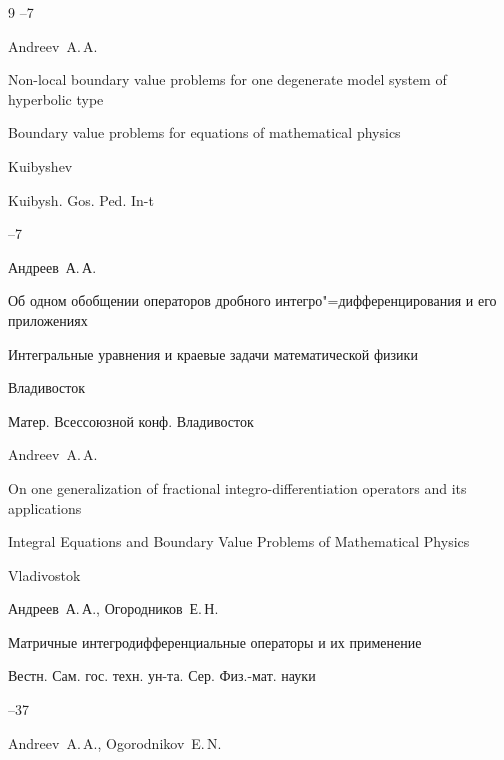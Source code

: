 \begin{thebibliography}{9}
--7

\misctransl 

\by Andreev~A.\,A. 

\paper Non-local boundary value problems for one  degenerate model system of hyperbolic type

\inbook Boundary value problems for equations of mathematical physics

\publaddr Kuibyshev

\publ Kuibysh. Gos. Ped. In-t


--7








\by Андреев~А.\,А.

\paper Об одном обобщении операторов дробного интегро"=дифференцирования и его приложениях

\inbook Интегральные уравнения и краевые задачи математической физики

\publaddr Владивосток

\bookinfo Матер. Всессоюзной конф. Владивосток



\misctransl 

\by Andreev~A.\,A. 

\paper On one generalization of fractional integro-differentiation operators  and its applications

\inbook Integral Equations and Boundary Value Problems of Mathematical Physics

\publaddr Vladivostok








\by Андреев~А.\,А., Огородников~Е.\,Н.

\paper Матричные интегродифференциальные операторы и их применение

\jour Вестн. Сам. гос. техн. ун-та. Сер. Физ.-мат. науки



--37

\misctransl

\by Andreev~A.\,A., Ogorodnikov~E.\,N.


\end{thebibliography}
